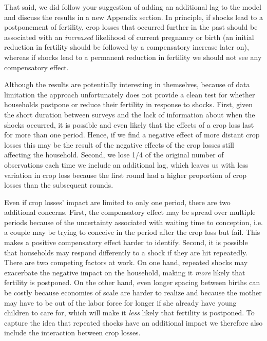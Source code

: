 \documentclass[letterpaper,12pt]{article}
\begin{document}
\begin{enumerate}
That said, we did follow your suggestion of adding an additional 
lag to the model and discuss the results in a new Appendix section.
In principle, if shocks lead to a postponement of fertility,
crop losses that occurred further in the past should be
associated with an \emph{increased} likelihood of current pregnancy 
or birth (an initial reduction in fertility should be followed
by a compensatory increase later on), 
whereas if shocks lead to a permanent reduction in fertility we
should not see any compensatory effect.

Although the results are potentially interesting in themselves,
because of data limitation the approach unfortunately does not  
provide a clean test for whether households postpone or reduce their 
fertility in response to shocks.
First, given the short duration between surveys and the lack of 
information about when the shocks occurred, it is possible and
even likely that the effects of a crop loss last for more than one period.
Hence, if we find a negative effect of more distant crop losses
this may be the result of the negative effects of the crop losses
still affecting the household.
Second, we lose 1/4 of the original number of observations each 
time we include an additional lag, which leaves us with less variation 
in crop loss because the first round had a higher proportion of crop 
losses than the subsequent rounds.

Even if crop losses' impact are limited to only one period, there 
are two additional concerns.
First, the compensatory effect may be spread over multiple 
periods because of the uncertainty associated with waiting time
to conception, i.e. a couple may be trying to conceive in the
period after the crop loss but fail.
This makes a positive compensatory effect harder to 
identify.
Second, it is possible that households may respond differently to a 
shock if they are hit repeatedly.
There are two competing factors at work.
On one hand, repeated shocks may exacerbate the negative impact on the
household, making it \emph{more} likely that fertility is postponed.
On the other hand, even longer spacing between births can be costly 
because economies of scale are harder to realize and because the 
mother may have to  be out of the labor force for longer if she 
already have young children to care for, which will make it
\emph{less} likely that fertility is postponed.
To capture the idea that repeated shocks have an additional
impact we therefore also include the interaction between 
crop losses. 


\end{enumerate}
\end{document}
